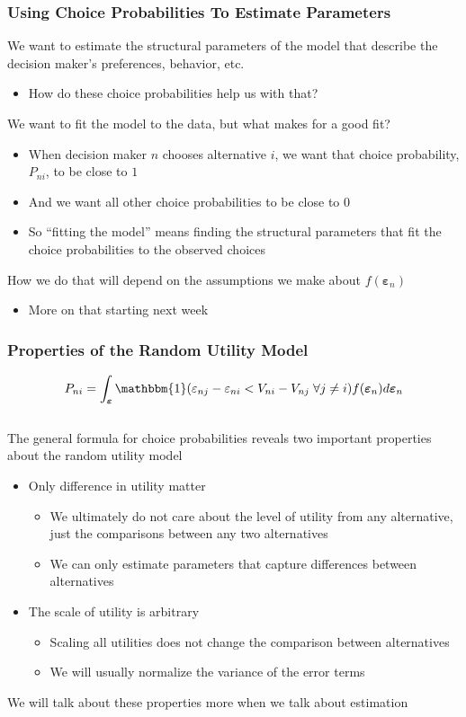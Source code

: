 \documentclass{beamer}\usepackage[]{graphicx}\usepackage[]{xcolor}
\begin{document}
\begin{frame}\frametitle{Using Choice Probabilities To Estimate Parameters}    
	We want to estimate the structural parameters of the model that describe the decision maker's preferences, behavior, etc.
	\begin{itemize}
		\item How do these choice probabilities help us with that?
	\end{itemize}
	\vspace{2ex}
	We want to fit the model to the data, but what makes for a good fit?
	\begin{itemize}
		\item When decision maker $n$ chooses alternative $i$, we want that choice probability, $P_{ni}$, to be close to $1$
		\item And we want all other choice probabilities to be close to $0$
		\item So ``fitting the model'' means finding the structural parameters that fit the choice probabilities to the observed choices
	\end{itemize}
	\vspace{2ex}
	How we do that will depend on the assumptions we make about $f(\bm{\varepsilon}_n)$
	\begin{itemize}
		\item More on that starting next week
	\end{itemize}
\end{frame}

\begin{frame}\frametitle{Properties of the Random Utility Model}
	$$P_{ni} = \int_{\bm{\varepsilon}} \mathbbm{1}(\varepsilon_{nj} - \varepsilon_{ni} < V_{ni} - V_{nj} \; \forall j \neq i) f(\bm{\varepsilon}_n) d\bm{\varepsilon}_n$$ \\
	\vspace{2ex}
    The general formula for choice probabilities reveals two important properties about the random utility model
    \begin{itemize}
    	\item Only difference in utility matter
    	\begin{itemize}
    		\item We ultimately do not care about the level of utility from any alternative, just the comparisons between any two alternatives
    		\item We can only estimate parameters that capture differences between alternatives
    	\end{itemize}
    	\item The scale of utility is arbitrary
    	\begin{itemize}
    		\item Scaling all utilities does not change the comparison between alternatives
    		\item We will usually normalize the variance of the error terms 
    	\end{itemize}
    \end{itemize}
    \vspace{2ex}
    We will talk about these properties more when we talk about estimation
\end{frame}
\end{document}
